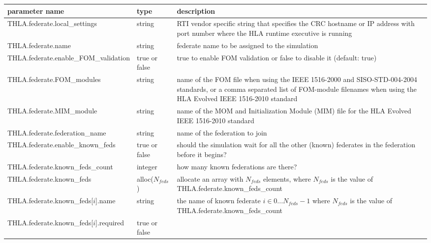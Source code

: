 \begin{table}[t]
  \scriptsize
  \begin{center}
    \begin{tabular}{|l|l|p{3.25in}|}
    \hline
    parameter name & type & description \\
    \hline \hline
      {\ttfamily THLA.federate.local\_settings} & string
      & RTI vendor specific string that specifies the CRC hostname or IP address with port number where the HLA runtime executive is running
      \\
      \hline
      {\ttfamily THLA.federate.name} & string
      & federate name to be assigned to the simulation
      \\
      \hline
      {\ttfamily THLA.federate.enable\_FOM\_validation} & true or false
      & true to enable FOM validation or false to disable it (default: true)
      \\
      \hline
      {\ttfamily THLA.federate.FOM\_modules} & string
      & name of the FOM file when using the IEEE 1516-2000 and SISO-STD-004-2004 standards, or a comma separated list of FOM-module filenames when using the HLA Evolved IEEE 1516-2010 standard
      \\
      \hline
      {\ttfamily THLA.federate.MIM\_module} & string
      & name of the MOM and Initialization Module (MIM) file for the HLA Evolved IEEE 1516-2010 standard
      \\
      \hline
      {\ttfamily THLA.federate.federation\_name} & string
      & name of the federation to join
      \\
      \hline
      {\ttfamily THLA.federate.enable\_known\_feds} & true or false
      & should the simulation wait for all the other (known) federates
        in the federation before it begins?
      \\
      \hline
      {\ttfamily THLA.federate.known\_feds\_count} & integer
      & how many known federations are there?
      \\
      \hline
      {\ttfamily THLA.federate.known\_feds} & alloc($N_{feds}$)
      & allocate an array with $N_{feds}$ elements, where $N_{feds}$ is the value of
        {\ttfamily THLA.federate.known\_feds\_count}
      \\
      \hline
      {\ttfamily THLA.federate.known\_feds[$i$].name} & string
      & the name of known federate $i \in 0...N_{feds}-1$ where $N_{feds}$ is the value of
        {\ttfamily THLA.federate.known\_feds\_count}
      \\
      \hline
      {\ttfamily THLA.federate.known\_feds[$i$].\-required} & true or false

\end{tabular}
\end{center}
\end{table}
